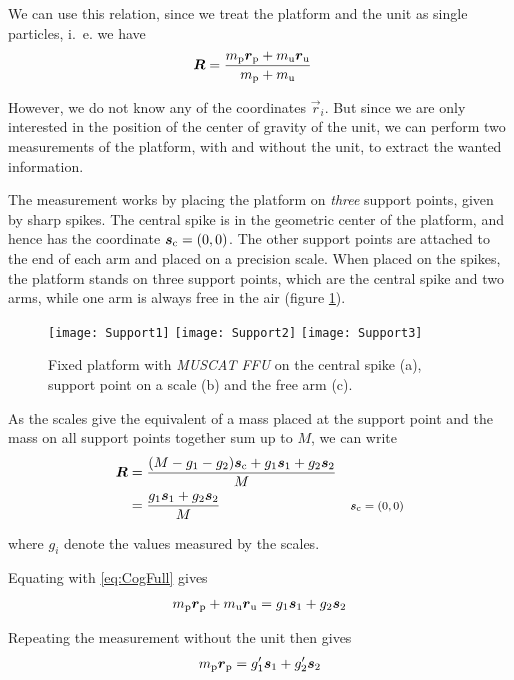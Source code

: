 \documentclass[journal]{IEEEtran}
\begin{document}
We can use this relation, since we treat the platform and the unit as single particles, i.~e. we have
\begin{align}
	\vec{R} & = \frac{m_{\textup{p}} \vec{r}_{\textup{p}} + m_{\textup{u}} \vec{r}_{\textup{u}}}{m_{\textup{p}} + m_{\textup{u}}} \label{eq:CogFull}
\end{align}

However, we do not know any of the coordinates $\vec{r}_i$. 
But since we are only interested in the position of the center of gravity of the unit, we can perform two measurements of the platform, with and without the unit, to extract the wanted information.

The measurement works by placing the platform on \emph{three} support points, given by sharp spikes.
The central spike is in the geometric center of the platform, and hence has the coordinate $\vec{s}_{\textup{c}} = (0, 0)$.
The other support points are attached to the end of each arm and placed on a precision scale. When placed on the spikes, the platform stands on three support points, which are the central spike and two arms, while one arm is always free in the air (figure \ref{fig:Support}).

\begin{figure}[b]
	\centering
	\texttt{[image: Support1]}
	\texttt{[image: Support2]}
	\texttt{[image: Support3]}
	\caption{Fixed platform with \emph{MUSCAT FFU} on the central spike (a), support point on a scale (b) and the free arm (c).}
	\label{fig:Support}
\end{figure}

As the scales give the equivalent of a mass placed at the support point and the mass on all support points together sum up to $M$, we can write
\begin{align}
	\vec{R} & = \frac{(M - g_1 - g_2) \vec{s}_{\textup{c}} + g_1 \vec{s}_1 + g_2 \vec{s}_2}{M} \\
	& = \frac{g_1 \vec{s}_1 + g_2 \vec{s}_2}{M} & \comment{$\vec{s}_{\textup{c}} = (0,0)$}
\end{align}

where $g_i$ denote the values measured by the scales.

Equating with \eqref{eq:CogFull} gives
\begin{align}
	m_{\textup{p}} \vec{r}_{\textup{p}} + m_{\textup{u}} \vec{r}_{\textup{u}} = g_1 \vec{s}_1 + g_2 \vec{s}_2
\end{align}

Repeating the measurement without the unit then gives
\begin{align}
	m_{\textup{p}} \vec{r}_{\textup{p}} = g_1' \vec{s}_1 + g_2' \vec{s}_2
\end{align}
\end{document}

